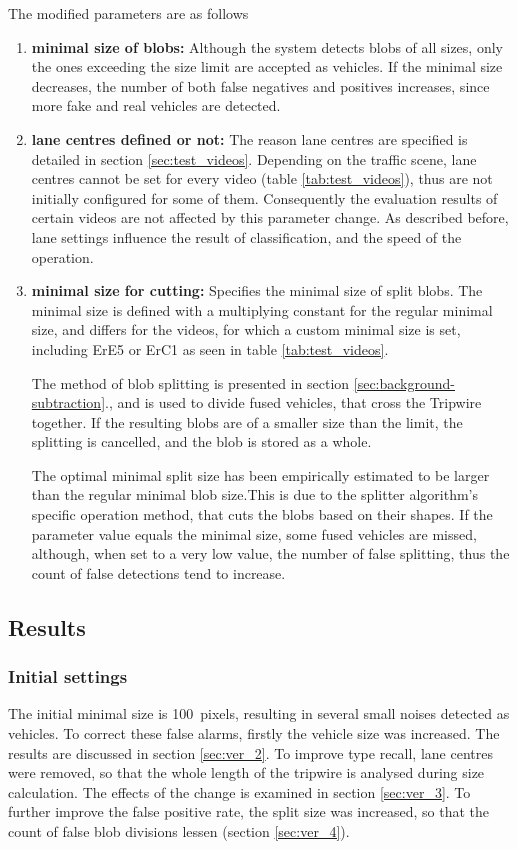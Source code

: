 \noindent The modified parameters are as follows
\begin{enumerate}
	\item \textbf{minimal size of blobs:} Although the system detects blobs of all sizes, only the ones exceeding the size limit are accepted as vehicles. If the minimal size decreases, the number of both false negatives and positives increases, since more fake and real vehicles are detected.
	
	\item \textbf{lane centres defined or not:} The reason lane centres are specified is detailed in section \ref{sec:test_videos}. Depending on the traffic scene, lane centres cannot be set for every video (table \ref{tab:test_videos}), thus are not initially configured for some of them. Consequently the evaluation results of certain videos are not affected by this parameter change. As described before, lane settings influence the result of classification, and the speed of the operation.
	
	\item \textbf{minimal size for cutting:} Specifies the minimal size of split blobs. The minimal size is defined with a multiplying constant for the regular minimal size, and differs for the videos, for which a custom minimal size is set, including ErE5 or ErC1 as seen in table \ref{tab:test_videos}. 
	
	The method of blob splitting is presented in section \ref{sec:background-subtraction}., and is used to divide fused vehicles, that cross the Tripwire together. If the resulting blobs are of a smaller size than the limit, the splitting is cancelled, and the blob is stored as a whole. 
	
	The optimal minimal split size has been empirically estimated to be larger than the regular minimal blob size.This is due to the splitter algorithm's specific operation method, that cuts the blobs based on their shapes. If the parameter value equals the minimal size, some fused vehicles are missed, although, when set to a very low value, the number of false splitting, thus the count of false detections tend to increase.
\end{enumerate}

\subsection{Results}
\subsubsection{Initial settings}
The initial minimal size is \SI{100}{pixels}, resulting in several small noises detected as vehicles.
To correct these false alarms, firstly the vehicle size was increased.
The results are discussed in section \ref{sec:ver_2}.
To improve type recall, lane centres were removed, so that the whole length of the tripwire is analysed during size calculation. 
The effects of the change is examined in section \ref{sec:ver_3}.
To further improve the false positive rate, the split size was increased, so that the count of false blob divisions lessen (section \ref{sec:ver_4}).

